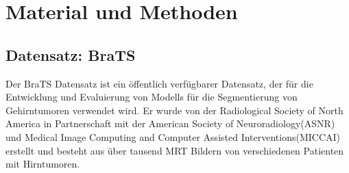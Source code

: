 \chapter{Material und Methoden}
\section{Datensatz: \ac{BraTS}}
\label{sec:Datensatz}
Der \ac{BraTS} Datensatz ist ein öffentlich verfügbarer Datensatz, der für die Entwicklung und Evaluierung von \glspl{Modell} für die Segmentierung von Gehirntumoren verwendet wird. Er wurde von der Radiological Society of North America in Partnerschaft mit der American Society of Neuroradiology(ASNR) und Medical Image Computing and Computer Assisted Interventions(MICCAI) erstellt und besteht aus über tausend \ac{MRT} Bildern von verschiedenen Patienten mit Hirntumoren. \cite[vgl.][]{RSNABrainTumor2021}

